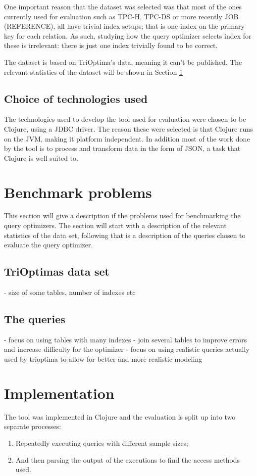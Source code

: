 One important reason that the dataset was selected was that most of the ones
currently used for evaluation such as TPC-H, TPC-DS or more recently JOB (REFERENCE), all
have trivial index setups; that is one index on the primary key for each
relation. As such, studying how the query optimizer selects index for these is
irrelevant: there is just one index trivially found to be correct.

The dataset is based on TriOptima's data, meaning it can't be published. The
relevant statistics of the dataset will be shown in Section \ref{sec:benchmark}

\subsection{Choice of technologies used}
The technologies used to develop the tool used for evaluation were chosen to be
Clojure, using a JDBC driver. The reason these were selected is that Clojure
runs on the JVM, making it platform independent. In addition most of the work
done by the tool is to process and transform data in the form of JSON, a task
that Clojure is well suited to.

\section{Benchmark problems} \label{sec:benchmark}
This section will give a description if the problems used for benchmarking the
query optimizers. The section will start with a description of the relevant
statistics of the data set, following that is a description of the queries
chosen to evaluate the query optimizer.

\subsection{TriOptimas data set}
- size of some tables, number of indexes etc

\subsection{The queries}
- focus on using tables with many indexes
- join several tables to improve errors and increase difficulty for the optimizer
- focus on using realistic queries actually used by trioptima to allow for
better and more realistic modeling

\section{Implementation}
The tool was implemented in Clojure and the evaluation is split up into two
separate processes:
\begin{enumerate}
\item Repeatedly executing queries with different sample sizes;
\item And then parsing the output of the executions to find the access methods used.
\end{enumerate}

